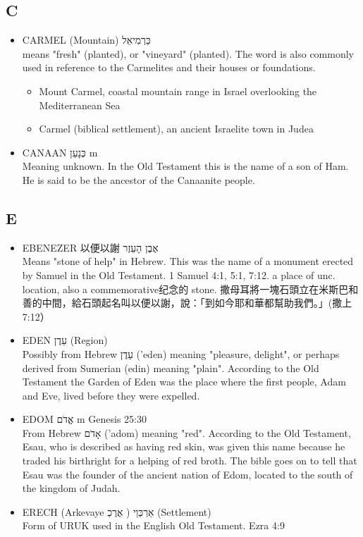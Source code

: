 \subsection{C}
\begin{itemize} 
\itemsep-.25em 
\item CARMEL (Mountain) כַּרְמִיאֵל \\
means "fresh" (planted), or "vineyard" (planted). The word is also commonly used in reference to the Carmelites and their houses or foundations. 
\begin{itemize} 
\itemsep-.25em 
\item Mount Carmel, coastal mountain range in Israel overlooking the Mediterranean Sea
\item Carmel (biblical settlement), an ancient Israelite town in Judea
\end{itemize}
\item CANAAN כְּנָעַן‎  m \\
Meaning unknown. In the Old Testament this is the name of a son of Ham. He is said to be the ancestor of the Canaanite people.
\end{itemize} 

 
\subsection{E}
\begin{itemize} 
\itemsep-.25em 
\item EBENEZER 以便以謝 אֶבֶן הָעֵזֶר  \\
Means "stone of help" in Hebrew. This was the name of a monument erected by Samuel in the Old Testament. 1 Samuel 4:1, 5:1, 7:12. a place of unc. location, also a commemorative纪念的 stone. 撒母耳將一塊石頭立在米斯巴和善的中間，給石頭起名叫以便以謝，說：「到如今耶和華都幫助我們。」(撒上7:12）
\item EDEN עֵדֶן (Region) \\
Possibly from Hebrew עֵדֶן ('eden) meaning "pleasure, delight", or perhaps derived from Sumerian (edin) meaning "plain". According to the Old Testament the Garden of Eden was the place where the first people, Adam and Eve, lived before they were expelled.
\item EDOM אֱדֹם m Genesis 25:30 \\
From Hebrew אָדֹם ('adom) meaning "red". According to the Old Testament, Esau, who is described as having red skin, was given this name because he traded his birthright for a helping of red broth. The bible goes on to tell that Esau was the founder of the ancient nation of Edom, located to the south of the kingdom of Judah.
\item ERECH (Arkevaye אַרְכְּוַי  ( אֶרֶכְ (Settlement) \\
Form of URUK used in the English Old Testament. Ezra 4:9
\end{itemize} 


